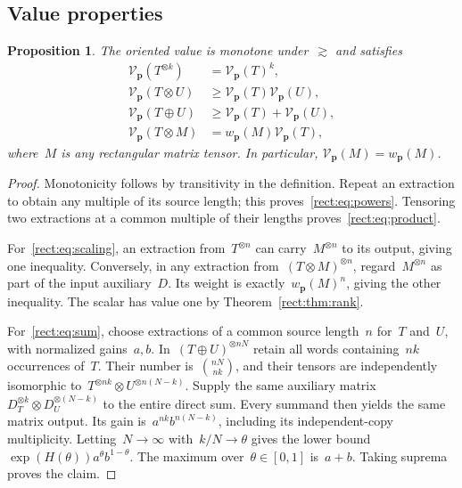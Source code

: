 \documentclass[11pt,letterpaper]{article}
\newtheorem{proposition}[theorem]{Proposition}
\theoremstyle{definition}
\numberwithin{equation}{section}
\begin{document}
\subsection{Value properties}
\begin{proposition}\label{rect:prop:properties}
The oriented value is monotone under~$\gtrsim$ and satisfies
\begin{align}
 \mathcal V_{\mathbf p}(T^{\otimes k})
 &=\mathcal V_{\mathbf p}(T)^k,\label{rect:eq:powers}\\
 \mathcal V_{\mathbf p}(T\otimes U)
 &\geq\mathcal V_{\mathbf p}(T)\mathcal V_{\mathbf p}(U),\label{rect:eq:product}\\
 \mathcal V_{\mathbf p}(T\oplus U)
 &\geq\mathcal V_{\mathbf p}(T)+\mathcal V_{\mathbf p}(U),\label{rect:eq:sum}\\
 \mathcal V_{\mathbf p}(T\otimes M)
 &=w_{\mathbf p}(M)\mathcal V_{\mathbf p}(T),\label{rect:eq:scaling}
\end{align}
where~$M$ is any rectangular matrix tensor. In particular,
$\mathcal V_{\mathbf p}(M)=w_{\mathbf p}(M)$.
\end{proposition}
\begin{proof}
Monotonicity follows by transitivity in the definition. Repeat an extraction to obtain any multiple of its source length; this proves~\eqref{rect:eq:powers}. Tensoring two extractions at a common multiple of their lengths proves~\eqref{rect:eq:product}.

For~\eqref{rect:eq:scaling}, an extraction from~$T^{\otimes n}$ can carry~$M^{\otimes n}$ to its output, giving one inequality. Conversely, in any extraction from~$(T\otimes M)^{\otimes n}$, regard~$M^{\otimes n}$ as part of the input auxiliary~$D$. Its weight is exactly~$w_{\mathbf p}(M)^n$, giving the other inequality. The scalar has value one by Theorem~\ref{rect:thm:rank}.

For~\eqref{rect:eq:sum}, choose extractions of a common source length~$n$ for~$T$ and~$U$, with normalized gains~$a,b$. In~$(T\oplus U)^{\otimes nN}$ retain all words containing~$nk$ occurrences of~$T$. Their number is~$\binom{nN}{nk}$, and their tensors are independently isomorphic to~$T^{\otimes nk}\otimes U^{\otimes n(N-k)}$. Supply the same auxiliary matrix~$D_T^{\otimes k}\otimes D_U^{\otimes(N-k)}$ to the entire direct sum. Every summand then yields the same matrix output. Its gain is~$a^{nk}b^{n(N-k)}$, including its independent-copy multiplicity. Letting~$N\to\infty$ with~$k/N\to\theta$ gives the lower bound
$\exp(H(\theta))a^\theta b^{1-\theta}$.
The maximum over~$\theta\in[0,1]$ is~$a+b$. Taking suprema proves the claim. 
\end{proof}
\end{document}
